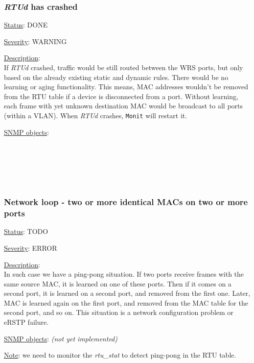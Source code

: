 \subsubsection{\bf \emph{RTUd} has crashed}
		\label{fail:data:rtu_crash}
		\begin{pck_descr}
			\item [] \underline{Status}: DONE
			\item [] \underline{Severity}: WARNING
			\item [] \underline{Description}:\\
				If \emph{RTUd} crashed, traffic would be still routed between the WRS ports, but
				only based on the already existing static and dynamic rules. There would be
				no learning or aging functionality. This means, MAC addresses wouldn't be
				removed from the RTU table if a device is disconnected from a port.
				Without learning, each frame with yet unknown destination MAC would be
				broadcast to all ports (within a VLAN). When \emph{RTUd} crashes,
				\texttt{Monit} will restart it.
			\item [] \underline{SNMP objects}:\\
        {\footnotesize
				\\
				\\
				\\
				\\
				\\
         }
		\end{pck_descr}

\subsubsection{\bf Network loop - two or more identical MACs on two or more ports}
		\label{fail:data:net_loop}
		\begin{pck_descr}
			\item [] \underline{Status}: TODO
			\item [] \underline{Severity}: ERROR
			\item [] \underline{Description}:\\
				In such case we have a ping-pong situation. If two ports receive frames
				with the same source MAC, it is learned on one of these ports. Then if
				it comes on a second port, it is learned on a second port, and removed
				from the first one. Later, MAC is learned again on the first port, and
				removed from the MAC table for the second port, and so on. This
				situation is a network configuration problem or eRSTP failure.
			\item [] \underline{SNMP objects}: \emph{(not yet implemented)}
			\item [] \underline{Note}: we need to monitor the \emph{rtu\_stat} to
				detect ping-pong in the RTU table.
		\end{pck_descr}

